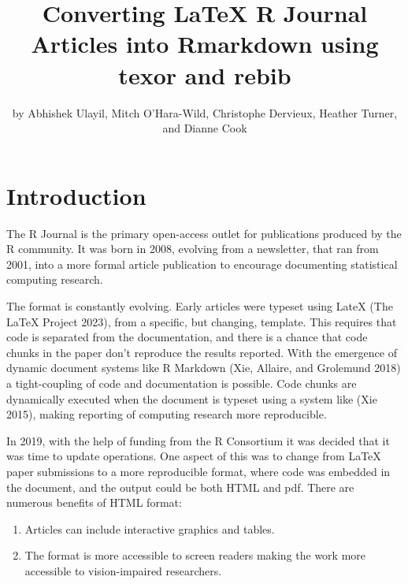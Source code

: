 \title{Converting LaTeX R Journal Articles into Rmarkdown using texor and rebib}


\author{by Abhishek Ulayil, Mitch O'Hara-Wild, Christophe Dervieux, Heather Turner, and Dianne Cook}

\maketitle


\hypertarget{introduction}{%
\section{Introduction}\label{introduction}}

The R Journal is the primary open-access outlet for publications produced by the R community. It was born in 2008, evolving from a newsletter, that ran from 2001, into a more formal article publication to encourage documenting statistical computing research.

The format is constantly evolving. Early articles were typeset using LateX (The LaTeX Project 2023), from a specific, but changing, template. This requires that code is separated from the documentation, and there is a chance that code chunks in the paper don't reproduce the results reported. With the emergence of dynamic document systems like R Markdown (Xie, Allaire, and Grolemund 2018) a tight-coupling of code and documentation is possible. Code chunks are dynamically executed when the document is typeset using a system like  (Xie 2015), making reporting of computing research more reproducible.

In 2019, with the help of funding from the R Consortium it was decided that it was time to update operations. One aspect of this was to change from LaTeX paper submissions to a more reproducible format, where code was embedded in the document, and the output could be both HTML and pdf. There are numerous benefits of HTML format:

\begin{enumerate}
\def\labelenumi{\arabic{enumi}.}
\tightlist
\item
  Articles can include interactive graphics and tables.
\item
  The format is more accessible to screen readers making the work more accessible to vision-impaired researchers.
\end{enumerate}

